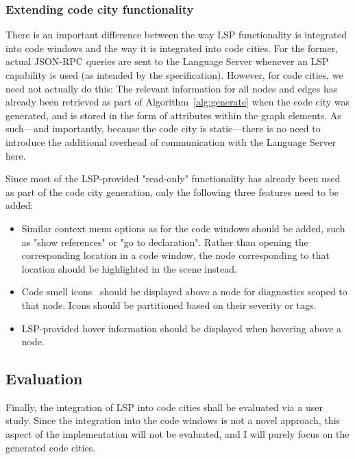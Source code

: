 \documentclass{scrartcl}
\begin{document}
{\subsubsection{Extending code city functionality}\label{subsubsec:city}
There is an important difference between the way LSP functionality is integrated into code windows and the way it is integrated into code cities.
For the former, actual JSON-RPC queries are sent to the Language Server whenever an LSP capability is used (as intended by the specification).
However, for code cities, we need not actually do this:
The relevant information for all nodes and edges has already been retrieved as part of Algorithm~\ref{alg:generate} when the code city was generated, and is stored in the form of attributes within the graph elements.
As such---and importantly, because the code city is static---there is no need to introduce the additional overhead of communication with the Language Server here.

Since most of the LSP-provided "read-only" functionality has already been used as part of the code city generation, only the following three features need to be added:
\begin{itemize}
	\item Similar context menu options as for the code windows should be added, such as "show references" or "go to declaration".
	      Rather than opening the corresponding location in a code window, the node corresponding to that location should be highlighted in the scene instead.
	\item Code smell icons~\cite{falko} should be displayed above a node for diagnostics scoped to that node.
	      Icons should be partitioned based on their severity or tags.
	\item LSP-provided hover information should be displayed when hovering above a node.
\end{itemize}


\subsection{Evaluation}\label{subsec:evaluation}
Finally, the integration of LSP into code cities shall be evaluated via a user study.
Since the integration into the code windows is not a novel approach, this aspect of the implementation will not be evaluated, and I will purely focus on the generated code cities.

}
\end{document}
